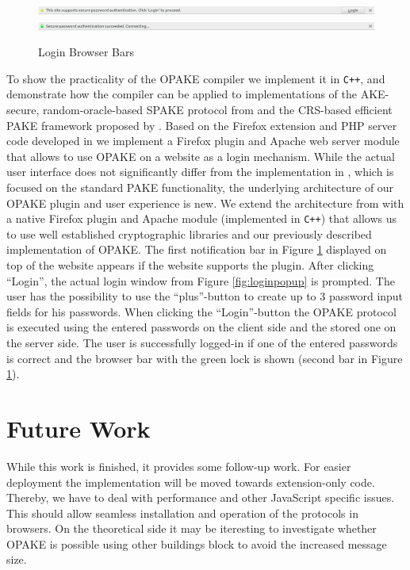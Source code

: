 \begin{figure}[b!]
	\centering
	\includegraphics[width=\textwidth]{img/LoginBar.png}
	\includegraphics[width=\textwidth]{img/LoginSuccess.png}
	\caption{Login Browser Bars}\label{fig:loginbar}
\end{figure}
\noindent
To show the practicality of the \ac{OPAKE} compiler we implement it in \verb/C++/, and demonstrate how the compiler can be applied to implementations of the \ac{AKE}-secure, random-oracle-based SPAKE protocol from \cite{Abdalla2005} and the \ac{CRS}-based efficient \ac{PAKE} framework proposed by \citeauthor{Gennaro2008} \cite{Gennaro2008}.
Based on the Firefox extension and PHP server code developed in \cite{MSD13} we implement a Firefox plugin and Apache web server module that allows to use \ac{OPAKE} on a website as a login mechanism.
While the actual user interface does not significantly differ from the implementation in \cite{MSD13}, which is focused on the standard PAKE functionality, the underlying architecture of our \ac{OPAKE} plugin and user experience is new.
We extend the architecture from \cite{MSD13} with a native Firefox plugin and Apache module (implemented in \texttt{C++}) that allows us to use well established cryptographic libraries and our previously described implementation of \ac{OPAKE}.
The first notification bar in Figure \ref{fig:loginbar} displayed on top of the website appears if the website supports the plugin.
After clicking ``Login'', the actual login window from Figure \ref{fig:loginpopup} is prompted.
The user has the possibility to use the ``plus''-button to create up to $3$ password input fields for his passwords.
When clicking the ``Login''-button the \ac{OPAKE} protocol is executed using the entered passwords on the client side and the stored one on the server side.
The user is successfully logged-in if one of the entered passwords is correct and the browser bar with the green lock is shown (second bar in Figure \ref{fig:loginbar}).

\section{Future Work}
While this work is finished, it provides some follow-up work.
For easier deployment the implementation will be moved towards extension-only code.
Thereby, we have to deal with performance and other JavaScript specific issues.
This should allow seamless installation and operation of the protocols in browsers.
On the theoretical side it may be iteresting to investigate whether \ac{OPAKE} is possible using other buildings block to avoid the increased message size.

